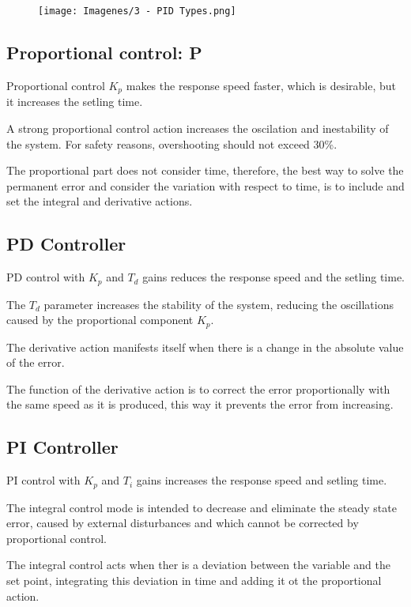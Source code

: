 \begin{figure}[H]
    \centering
    \texttt{[image: Imagenes/3 - PID Types.png]}
\end{figure}

\subsection{Proportional control: P}
Proportional control $K_p$ makes the response speed faster, which is desirable, but it increases the setling time.

A strong proportional control action increases the oscilation and inestability of the system. For safety reasons, overshooting should not exceed 30\%.

The proportional part does not consider time, therefore, the best way to solve the permanent error and consider the variation with respect to time, is to include and set the integral and derivative actions.

\subsection{PD Controller}
PD control with $K_p$ and $T_d$ gains reduces the response speed and the setling time. 

The $T_d$ parameter increases the stability of the system, reducing the oscillations caused by the proportional component $K_p$.

The derivative action manifests itself when there is a change in the absolute value of the error. 

The function of the derivative action is to correct the error proportionally with the same speed as it is produced, this way it prevents the error from increasing.

\subsection{PI Controller}
PI control with $K_p$ and $T_i$ gains increases the response speed and setling time. 

The integral control mode is intended to decrease and eliminate the steady state error, caused by external disturbances and which cannot be corrected by proportional control.

The integral control acts when ther is a deviation between the variable and the set point, integrating this deviation in time and adding it ot the proportional action.

